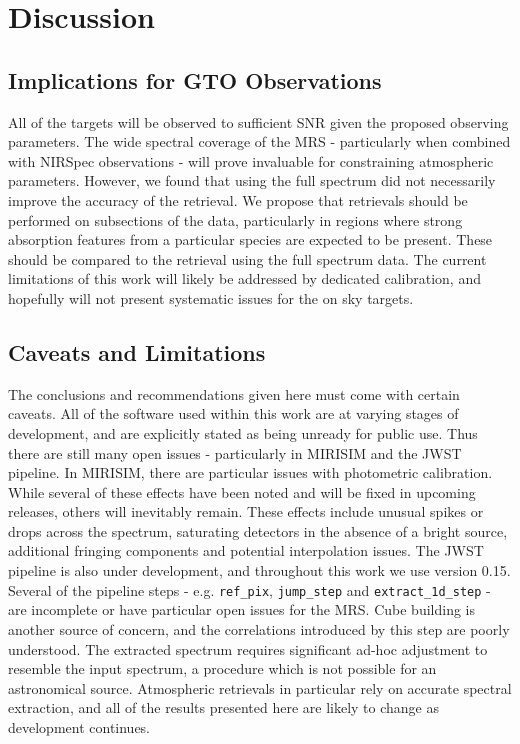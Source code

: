 \section{Discussion}
\subsection{Implications for GTO Observations}
All of the targets will be observed to sufficient SNR given the proposed observing parameters.
The wide spectral coverage of the MRS - particularly when combined with NIRSpec observations - will prove invaluable for constraining atmospheric parameters.
However, we found that using the full spectrum did not necessarily improve the accuracy of the retrieval.
We propose that retrievals should be performed on subsections of the data, particularly in regions where strong absorption features from a particular species are expected to be present.
These should be compared to the retrieval using the full spectrum data.
The current limitations of this work will likely be addressed by dedicated calibration, and hopefully will not present systematic issues for the on sky targets.
\subsection{Caveats and Limitations}
The conclusions and recommendations given here must come with certain caveats.
All of the software used within this work are at varying stages of development, and are explicitly stated as being unready for public use.
Thus there are still many open issues - particularly in MIRISIM and the JWST pipeline.
In MIRISIM, there are particular issues with photometric calibration. 
While several of these effects have been noted and will be fixed in upcoming releases, others will inevitably remain.
These effects include unusual spikes or drops across the spectrum, saturating detectors in the absence of a bright source, additional fringing components and potential interpolation issues.
The JWST pipeline is also under development, and throughout this work we use version 0.15.
Several of the pipeline steps - e.g. \verb|ref_pix|, \verb|jump_step| and \verb|extract_1d_step| - are incomplete or have particular open issues for the MRS.
Cube building is another source of concern, and the correlations introduced by this step are poorly understood.
The extracted spectrum requires significant ad-hoc adjustment to resemble the input spectrum, a procedure which is not possible for an astronomical source.
Atmospheric retrievals in particular rely on accurate spectral extraction, and all of the results presented here are likely to change as development continues.

